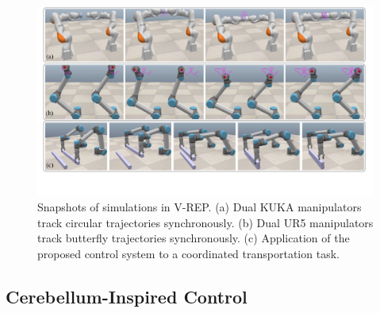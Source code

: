 \documentclass[journal,twoside,web]{ieeecolor}
\begin{document}
\begin{figure}[!t]
    \centering
    \includegraphics[width=0.9\linewidth]{figures/simulation/FIG3_TII-24-5492.pdf}
    \caption{Snapshots of simulations in V-REP. (a) Dual KUKA manipulators track circular trajectories synchronously. (b) Dual UR5 manipulators track butterfly trajectories synchronously. (c) Application of the proposed control system to a coordinated transportation task.
    }
    \label{Fig:sim:circularPathSnapshots}
\end{figure}

\subsection{Cerebellum-Inspired Control}
\end{document}
